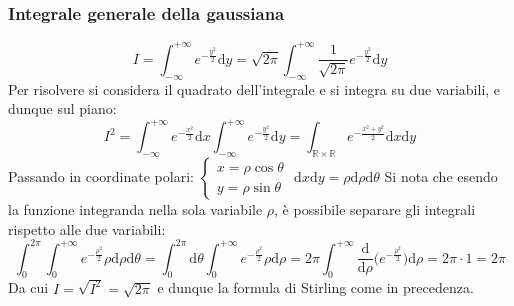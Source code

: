 \documentclass[10pt]{article}
\theoremstyle{plain}
\begin{document}
\subsubsection{Integrale generale della gaussiana}
\[I = \int_{-\infty}^{+\infty} e^{-\frac{y^2}{2}} \textrm{d}y = \sqrt{2\pi}\int_{-\infty}^{+\infty} \frac{1}{\sqrt{2\pi}}e^{-\frac{y^2}{2}} \textrm{d}y\]
Per risolvere si considera il quadrato dell'integrale e si integra su due variabili, e dunque sul piano:
\[I^2 = \int_{-\infty}^{+\infty} e^{-\frac{x^2}{2}} \textrm{d}x \int_{-\infty}^{+\infty} e^{-\frac{y^2}{2}} \textrm{d}y = \int_{\mathbb{R}\times \mathbb{R}} e^{-\frac{x^2+ y^2}{2}} \textrm{d}x\textrm{d}y  \]
Passando in coordinate polari: $\displaystyle \begin{cases}
    x = \rho \cos \theta \\ y = \rho \sin \theta
\end{cases}$ $\textrm{d}x \textrm{d}y = \rho \textrm{d}\rho \textrm{d}\theta$
Si nota che esendo la funzione integranda nella sola variabile $\rho$, è possibile separare gli integrali rispetto alle due variabili:
\[\int_{0}^{2\pi}\int_0^{+\infty} e^{-\frac{\rho^2}{2}} \rho \textrm{d}\rho \textrm{d}\theta = \int_{0}^{2\pi} \textrm{d}\theta \int_0^{+\infty}e^{-\frac{\rho^2}{2}} \rho \textrm{d}\rho = 2\pi \int_0^{+\infty}\frac{\textrm{d}}{\textrm{d}\rho}\big(e^{\displaystyle-\frac{\rho^2}{2}}\big)\textrm{d}\rho = 2\pi \cdot 1 = 2\pi\]
Da cui $\displaystyle I = \sqrt{I^2} = \sqrt{2\pi}$ e dunque la formula di Stirling come in precedenza.
\end{document}
